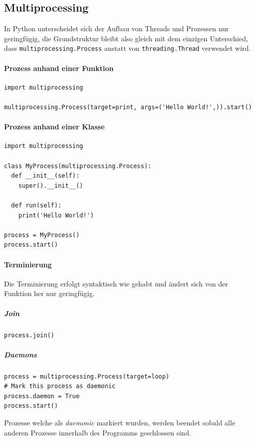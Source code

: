 \documentclass[a4paper,11pt]{article}
\begin{document}
\newpage

\subsection{Multiprocessing}
In Python unterscheidet sich der Aufbau von Threads und Prozessen nur geringf\"ugig, 
die Grundstruktur bleibt also gleich mit dem einzigen Unterschied, dass \texttt{multiprocessing.Process} anstatt von \texttt{threading.Thread} verwendet wird.

\paragraph{Prozess anhand einer Funktion}
\begin{verbatim}
import multiprocessing

multiprocessing.Process(target=print, args=('Hello World!',)).start()
\end{verbatim}

\paragraph*{Prozess anhand einer Klasse}
\begin{verbatim}
import multiprocessing
 
class MyProcess(multiprocessing.Process):
  def __init__(self):
    super().__init__()
    
  def run(self):
    print('Hello World!')
    
process = MyProcess()
process.start()
\end{verbatim}

\paragraph{Terminierung}
\begin{flushleft}
Die Terminierung erfolgt syntaktisch wie gehabt und \"andert sich von der Funktion her nur geringf\"ugig.
\end{flushleft}
\subparagraph{Join}
\begin{verbatim}
process.join()
\end{verbatim}
\subparagraph{Daemons}
\begin{verbatim}
process = multiprocessing.Process(target=loop)
# Mark this process as daemonic
process.daemon = True
process.start()
\end{verbatim}
Prozesse welche als \textit{daemonic} markiert wurden, werden beendet sobald alle anderen Prozesse innerhalb des Programms geschlossen sind.

%
%
\end{document}
